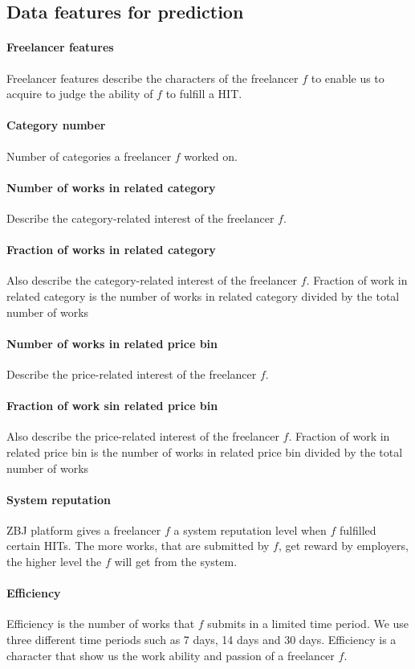 \documentclass{article}
\begin{document}
\subsection{Data features for prediction}
\paragraph{Freelancer features} Freelancer features describe the characters of the freelancer $f$ to enable us to acquire to judge the ability of $f$ to fulfill a HIT.  
 \paragraph{Category number} Number of categories a freelancer $f$ worked on.
 \paragraph{ Number of works in related category}  Describe the category-related interest of the freelancer $f$.
 \paragraph{ Fraction of works in related category} Also describe the category-related interest of the freelancer $f$. Fraction of work in related category is the number of works in related category divided by the  total number of works
 \paragraph{ Number of works in related price bin}  Describe the price-related interest of the freelancer $f$.
 \paragraph{ Fraction of work sin related price bin} Also describe the price-related interest of the freelancer $f$. Fraction of work in related price bin is the number of works in related price bin divided by the  total number of works
 \paragraph{ System reputation} ZBJ platform gives a  freelancer $f$ a system reputation level when $f$ fulfilled certain HITs. The more works, that are submitted by $f$, get reward by employers, the higher level the $f$ will get from the system.
 \paragraph{ Efficiency} Efficiency is the number of works that $f$ submits in a limited time period. We use three different time periods such as  7 days, 14 days and 30 days. Efficiency is a character that show us the work ability and  passion of a freelancer $f$.
\end{document}
